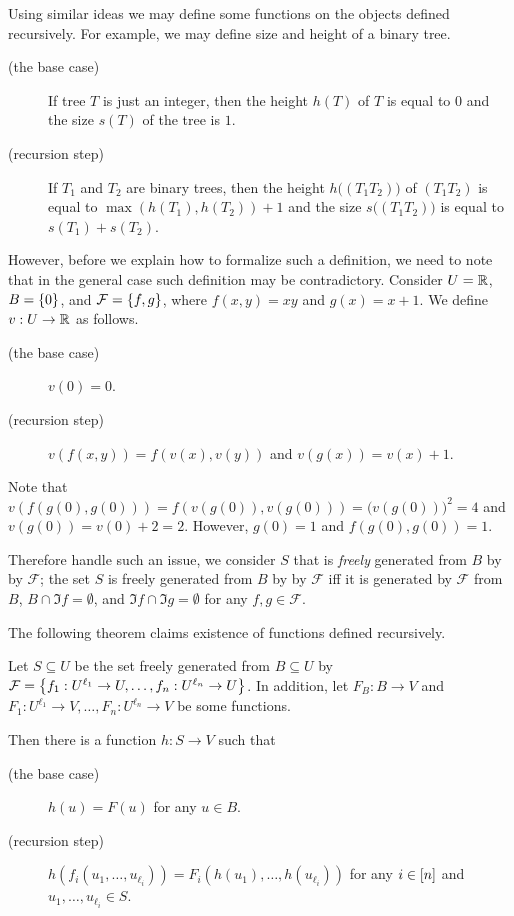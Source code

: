 Using similar ideas we may define some functions on the objects defined
recursively. For example, we may define size and height of a binary tree.
\begin{description}
  \item [(the base case)] If tree $T$ is just an integer, then the height $h(T)$
    of $T$ is equal to $0$ and the size $s(T)$ of the tree is $1$.
  \item[(recursion step)] If $T_1$ and $T_2$ are binary trees, then the height
    $h\big((T_1 T_2)\big)$ of $(T_1 T_2)$ is equal to $\max(h(T_1), h(T_2)) + 1$
    and the size $s\big((T_1 T_2)\big)$ is equal to $s(T_1) + s(T_2)$.
\end{description}

However, before we explain how to formalize such a definition, we need to note
that in the general case such definition may be contradictory. Consider
$U = \mathbb{R}$, $B = \set{0}$, and $\mathcal{F} = \set{f, g}$, where $f(x, y) = xy$
and $g(x) = x + 1$. We define $v : U \to \mathbb{R}$ as follows.
\begin{description}
  \item [(the base case)] $v(0) = 0$.
  \item[(recursion step)] $v(f(x, y)) = f(v(x), v(y))$ and $v(g(x)) = v(x) + 1$.
\end{description}
Note that $v(f(g(0), g(0))) = f(v(g(0)), v(g(0))) = \big(v(g(0))\big)^2 = 4$
and $v(g(0)) = v(0) + 2 = 2$.
However, $g(0) = 1$ and $f(g(0), g(0)) = 1$.

Therefore handle such an issue, we consider $S$ that is \emph{freely} generated
from $B$ by by $\mathcal{F}$; the set $S$ is freely generated
from $B$ by by $\mathcal{F}$ iff it is generated by $\mathcal{F}$ from $B$,
$B \cap \Im f = \emptyset$, and $\Im f \cap \Im g = \emptyset$ for any
$f, g \in \mathcal{F}$.

The following theorem claims existence of functions defined recursively.
\begin{theorem}
\label{theorem:recursion-principle}
  Let $S \subseteq U$ be the set freely generated from $B \subseteq U$ by
  $\mathcal{F} = \set{f_1 : U^{\ell_1} \to U, \dots, f_n : U^{\ell_n} \to U}$.
  In addition, let $F_B : B \to V$ and
  $F_1 : U^{\ell_1} \to V, \dots, F_n : U^{\ell_n} \to V$ be some functions.

  Then there is a function $h : S \to V$ such that
  \begin{description}
    \item [(the base case)] $h(u) = F(u)$ for any $u \in B$.
    \item[(recursion step)] $h(f_i(u_1, \dots, u_{\ell_i})) =
      F_i(h(u_1), \dots, h(u_{\ell_i}))$ for any $i \in [{n}]$ and
      $u_1, \dots, u_{\ell_i} \in S$.
  \end{description}
\end{theorem}


